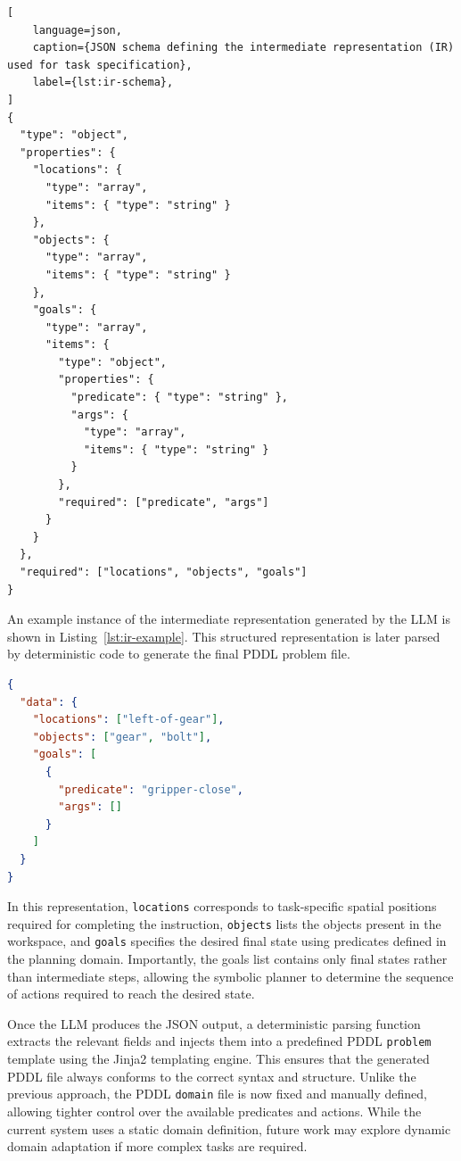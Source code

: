 \documentclass[12pt]{extarticle}
\begin{document}
\begin{lstlisting}[
    language=json, 
    caption={JSON schema defining the intermediate representation (IR) used for task specification},
    label={lst:ir-schema},
]
{
  "type": "object",
  "properties": {
    "locations": {
      "type": "array",
      "items": { "type": "string" }
    },
    "objects": {
      "type": "array",
      "items": { "type": "string" }
    },
    "goals": {
      "type": "array",
      "items": {
        "type": "object",
        "properties": {
          "predicate": { "type": "string" },
          "args": {
            "type": "array",
            "items": { "type": "string" }
          }
        },
        "required": ["predicate", "args"]
      }
    }
  },
  "required": ["locations", "objects", "goals"]
}
\end{lstlisting}

An example instance of the intermediate representation generated by the LLM is shown in Listing~\ref{lst:ir-example}. This structured representation is later parsed by deterministic code to generate the final PDDL problem file.

\begin{lstlisting}[language=json, caption={Example intermediate representation generated by the LLM}, label={lst:ir-example}]
{
  "data": {
    "locations": ["left-of-gear"],
    "objects": ["gear", "bolt"],
    "goals": [
      {
        "predicate": "gripper-close",
        "args": []
      }
    ]
  }
}
\end{lstlisting}

In this representation, \texttt{locations} corresponds to task-specific spatial positions required for completing the instruction, \texttt{objects} lists the objects present in the workspace, and \texttt{goals} specifies the desired final state using predicates defined in the planning domain. Importantly, the goals list contains only final states rather than intermediate steps, allowing the symbolic planner to determine the sequence of actions required to reach the desired state.

Once the LLM produces the JSON output, a deterministic parsing function extracts the relevant fields and injects them into a predefined PDDL \texttt{problem} template using the Jinja2 templating engine. This ensures that the generated PDDL file always conforms to the correct syntax and structure. Unlike the previous approach, the PDDL \texttt{domain} file is now fixed and manually defined, allowing tighter control over the available predicates and actions. While the current system uses a static domain definition, future work may explore dynamic domain adaptation if more complex tasks are required.
\end{document}
